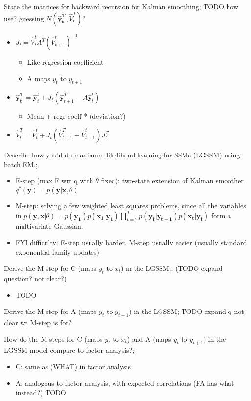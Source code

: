 \documentclass{article}
\begin{document}
State the matrices for backward recursion for Kalman smoothing; TODO how use? guessing $N(\mathbf{\hat{y}^T_t},\hat{V}^T_t)$?  \begin{itemize} \item $J_t=\hat{V}^t_tA^T(\hat{V}^t_{t+1})^{-1}$ \begin{itemize} \item Like regression coefficient \item A maps $y_t$ to $y_{t+1}$ \end{itemize} \item $\mathbf{\hat{y}^T_t}=\hat{\mathbf{y}}^t_t+J_t(\hat{\mathbf{y}}^T_{t+1}-A\hat{\mathbf{y}}^t_t)$ \begin{itemize} \item Mean + regr coeff * (deviation?) \end{itemize} \item $\hat{V}^T_t=\hat{V}^t_t+J_t(\hat{V}^T_{t+1}-\hat{V}^t_{t+1})J_t^T$ \end{itemize}

Describe how you'd do maximum likelihood learning for SSMs (LGSSM) using batch EM.; \begin{itemize} \item E-step (max F wrt q with $\theta$ fixed): two-state extension of Kalman smoother $q^*(\mathbf{y})=p(\mathbf{y|x}, \theta)$ \item M-step: solving a few weighted least squares problems, since all the variables in $p(\mathbf{y, x}|\theta)=p(\mathbf{y_1})p(\mathbf{x_1|y_1})\prod_{t=2}^Tp(\mathbf{y_t|y_{t-1}})p(\mathbf{x_t|y_t})$ form a multivariate Gaussian. \item FYI difficulty: E-step usually harder, M-step usually easier (usually standard exponential family updates) \end{itemize}

Derive the M-step for C (maps $y_t$ to $x_t$) in the LGSSM.; (TODO expand question? not clear?) \begin{itemize} \item TODO  \end{itemize}

Derive the M-step for A (maps $y_t$ to $y_{t+1}$) in the LGSSM; TODO expand q not clear wt M-step is for?

How do the M-steps for C (maps $y_t$ to $x_t$) and A (maps $y_t$ to $y_{t+1}$) in the LGSSM model compare to factor analysis?; \begin{itemize} \item C: same as (WHAT) in factor analysis \item A: analogous to factor analysis, with expected correlations (FA has what instead?) TODO \end{itemize}
\end{document}
